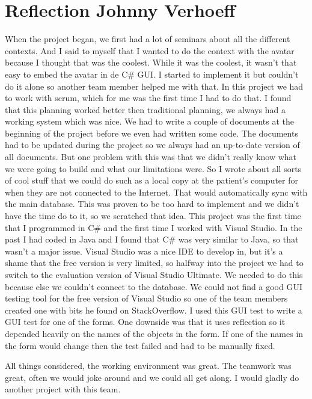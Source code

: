 \section{Reflection Johnny Verhoeff}
When the project began, we first had a lot of seminars about all the different contexts. And I said to myself that I wanted to do the context with the avatar because I thought that was the coolest. While it was the coolest, it wasn't that easy to embed the avatar in de C\# GUI. I started to implement it but couldn't do it alone so another team member helped me with that. In this project we had to work with scrum, which for me was the first time I had to do that. I found that this planning worked better then traditional planning, we always had a working system which was nice. 
We had to write a couple of documents at the beginning of the project before we even had written some code. The documents had to be updated during the project so we always had an up-to-date version of all documents. But one problem with this was that we didn't really know what we were going to build and what our limitations were. So I wrote about all sorts of cool stuff that we could do such as a local copy at the patient's computer for when they are not connected to the Internet. That would automatically sync with the main database. This was proven to be too hard to implement and we didn't have the time do to it, so we scratched that idea. 
This project was the first time that I programmed in C\# and the first time I worked with Visual Studio.  In the past I had coded in Java and I found that C\# was very similar to Java, so that wasn't a major issue. Visual Studio was a nice IDE to develop in, but it's a shame that the free version is very limited, so halfway into the project we had to switch to the evaluation version of Visual Studio Ultimate. We needed to do this because else we couldn't connect to the database.
We could not find a good GUI testing tool for the free version of Visual Studio so one of the team members created one with bits he found on StackOverflow. I used this GUI test to write a GUI test for one of the forms.  One downside was that it uses reflection so it depended heavily on the names of the objects in the form. If one of the names in the form would change then the test failed and had to be manually fixed.

All things considered, the working environment was great. The teamwork was great, often we would joke around and we could all get along.
I would gladly do another project with this team.

